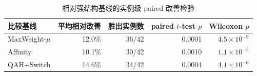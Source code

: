 \begin{table}[H]
    \centering
    \small
    \caption{\gPAH 相对强结构基线的实例级 paired 改善检验}
    \label{tab:gpah-pairwise-tests}
    \begin{tabular}{lrrrr}
        \toprule
        比较基线 & 平均相对改善 & 胜出实例数 & paired \(t\)-test \(p\) & Wilcoxon \(p\) \\
        \midrule
        MaxWeight-\(\mu\) & 12.0\% & 36/42 & 0.0001 & \(4.5\times 10^{-9}\) \\
        Affinity & 10.1\% & 30/42 & 0.0010 & \(1.1\times 10^{-5}\) \\
        QAH+Switch & 14.6\% & 34/42 & 0.0004 & \(4.1\times 10^{-6}\) \\
        \bottomrule
    \end{tabular}
\end{table}
